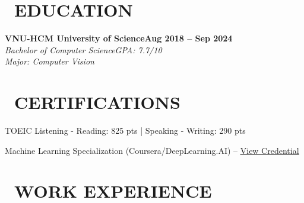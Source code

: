 \documentclass[letterpaper,10pt]{article}
\newcommand{\heading}[2]{
  \hspace{10pt}#1\hfill#2\\
}
\newcommand{\headingBf}[2]{
  \heading{\textbf{#1}}{\textbf{#2}}
}
\newcommand{\headingIt}[2]{
  \heading{\textit{#1}}{\textit{#2}}
}
\newenvironment{resume_list}{
  \vspace{-7pt}
  \begin{itemize}[itemsep=-2px, parsep=1pt, leftmargin=30pt]
}{
  \end{itemize}
}
\begin{document}
 
   \section{\faGraduationCap\ EDUCATION}
 
   \headingBf{VNU-HCM University of Science}{Aug 2018 -- Sep 2024}
   \headingIt{Bachelor of Computer Science}{GPA: 7.7/10}
   \headingIt{Major: Computer Vision}{}
 
   \section{\faCertificate\ CERTIFICATIONS}
   \begin{resume_list}
     \item TOEIC Listening - Reading: 825 pts | Speaking - Writing: 290 pts
     \item Machine Learning Specialization (Coursera/DeepLearning.AI) -- \href{https://coursera.org/verify/specialization/KLJQLHVZTC92}{\underline{View Credential}}
   \end{resume_list}
 
 


  \section{\faBriefcase\ WORK EXPERIENCE}
   
\end{document}
